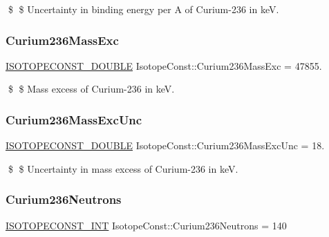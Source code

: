 \$ \$ Uncertainty in binding energy per A of Curium-\/236 in keV. \mbox{\label{group___isotope_const-_curium-_cm236_ga6eb6c0ff3e74425c9b9856157b81efc8}} 
\subsubsection{\texorpdfstring{Curium236\+Mass\+Exc}{Curium236MassExc}}
{\footnotesize\ttfamily \mbox{\hyperlink{group___isotope_const-_macros_ga8f45a7272ce02c0b4c65c44636ed719a}{I\+S\+O\+T\+O\+P\+E\+C\+O\+N\+S\+T\+\_\+\+D\+O\+U\+B\+LE}} Isotope\+Const\+::\+Curium236\+Mass\+Exc = 47855.}

\$ \$ Mass excess of Curium-\/236 in keV. \mbox{\label{group___isotope_const-_curium-_cm236_gaea5022ca752e30592e61d341420822c2}} 
\subsubsection{\texorpdfstring{Curium236\+Mass\+Exc\+Unc}{Curium236MassExcUnc}}
{\footnotesize\ttfamily \mbox{\hyperlink{group___isotope_const-_macros_ga8f45a7272ce02c0b4c65c44636ed719a}{I\+S\+O\+T\+O\+P\+E\+C\+O\+N\+S\+T\+\_\+\+D\+O\+U\+B\+LE}} Isotope\+Const\+::\+Curium236\+Mass\+Exc\+Unc = 18.}

\$ \$ Uncertainty in mass excess of Curium-\/236 in keV. \mbox{\label{group___isotope_const-_curium-_cm236_ga7e64e98ea6699e98144d017450c86ce3}} 
\subsubsection{\texorpdfstring{Curium236\+Neutrons}{Curium236Neutrons}}
{\footnotesize\ttfamily \mbox{\hyperlink{group___isotope_const-_macros_ga5f18360b3e99483a35c32d789e62621c}{I\+S\+O\+T\+O\+P\+E\+C\+O\+N\+S\+T\+\_\+\+I\+NT}} Isotope\+Const\+::\+Curium236\+Neutrons = 140}


